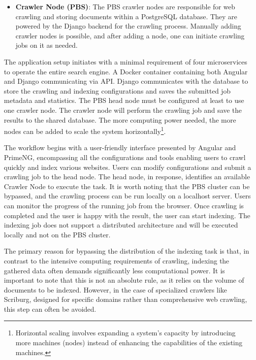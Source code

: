 \begin{itemize}
  \item[] \textbf{Crawler Node (PBS)}: The PBS crawler nodes are responsible for web crawling and storing documents within a PostgreSQL database. They are powered by the Django backend for the crawling process. Manually adding crawler nodes is possible, and after adding a node, one can initiate crawling jobs on it as needed.
\end{itemize}

The application setup initiates with a minimal requirement of four microservices to operate the entire search engine. A Docker container containing both Angular and Django communicating via API. Django communicates with the database to store the crawling and indexing configurations and saves the submitted job metadata and statistics. The PBS head node must be configured at least to use one crawler node. The crawler node will perform the crawling job and save the results to the shared database. The more computing power needed, the more nodes can be added to scale the system horizontally\footnote{Horizontal scaling involves expanding a system's capacity by introducing more machines (nodes) instead of enhancing the capabilities of the existing machines.}. 

The workflow begins with a user-friendly interface presented by Angular and PrimeNG, encompassing all the configurations and tools enabling users to crawl quickly and index various websites. Users can modify configurations and submit a crawling job to the head node. The head node, in response, identifies an available Crawler Node to execute the task. It is worth noting that the PBS cluster can be bypassed, and the crawling process can be run locally on a localhost server. Users can monitor the progress of the running job from the browser. Once crawling is completed and the user is happy with the result, the user can start indexing. The indexing job does not support a distributed architecture and will be executed locally and not on the PBS cluster.

The primary reason for bypassing the distribution of the indexing task is that, in contrast to the intensive computing requirements of crawling, indexing the gathered data often demands significantly less computational power. It is important to note that this is not an absolute rule, as it relies on the volume of documents to be indexed. However, in the case of specialized crawlers like Scriburg, designed for specific domains rather than comprehensive web crawling, this step can often be avoided.


